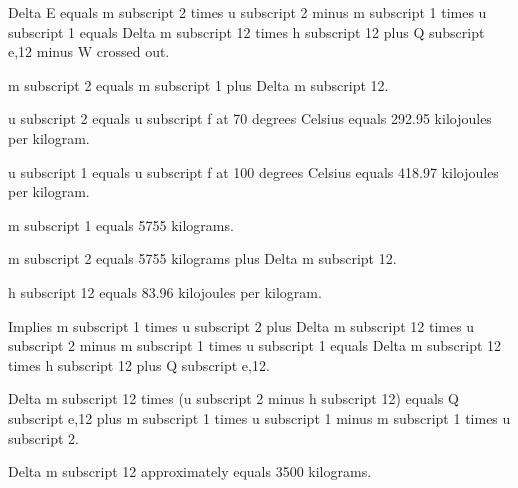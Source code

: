 Delta E equals m subscript 2 times u subscript 2 minus m subscript 1 times u subscript 1 equals Delta m subscript 12 times h subscript 12 plus Q subscript e,12 minus W crossed out.

m subscript 2 equals m subscript 1 plus Delta m subscript 12.

u subscript 2 equals u subscript f at 70 degrees Celsius equals 292.95 kilojoules per kilogram.

u subscript 1 equals u subscript f at 100 degrees Celsius equals 418.97 kilojoules per kilogram.

m subscript 1 equals 5755 kilograms.

m subscript 2 equals 5755 kilograms plus Delta m subscript 12.

h subscript 12 equals 83.96 kilojoules per kilogram.

Implies m subscript 1 times u subscript 2 plus Delta m subscript 12 times u subscript 2 minus m subscript 1 times u subscript 1 equals Delta m subscript 12 times h subscript 12 plus Q subscript e,12.

Delta m subscript 12 times (u subscript 2 minus h subscript 12) equals Q subscript e,12 plus m subscript 1 times u subscript 1 minus m subscript 1 times u subscript 2.

Delta m subscript 12 approximately equals 3500 kilograms.